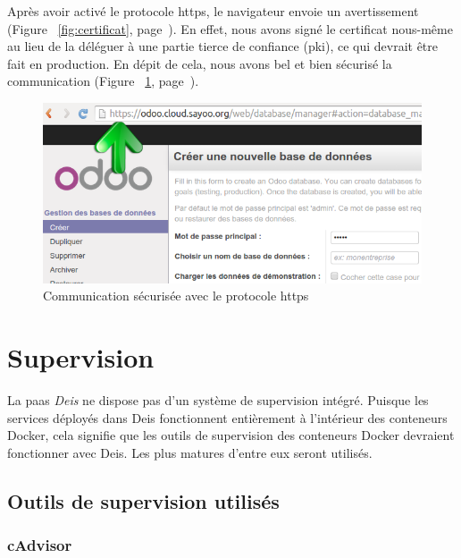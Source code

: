 \begin{onehalfspace}
Après avoir activé le protocole \acrshort{https}, le navigateur envoie un avertissement (Figure ~\ref{fig:certificat}, page~\pageref{fig:certificat}). En effet, nous avons signé le certificat nous-même au lieu de la déléguer à une partie tierce de confiance (\acrshort{pki}), ce qui devrait être fait en production. En dépit de cela, nous avons bel et bien sécurisé la communication (Figure ~\ref{fig:https}, page~\pageref{fig:https}).

\begin{figure}[H]
\centering
\includegraphics [scale=0.5]{chapitre5/assets/https}
\caption{Communication sécurisée avec le protocole \acrshort{https}}
\label{fig:https}
\end{figure}


\section{Supervision}

La \acrshort{paas} \emph{Deis} ne dispose pas d'un système de supervision intégré. Puisque les services déployés dans Deis fonctionnent entièrement à l'intérieur des conteneurs Docker, cela signifie que les outils de supervision des conteneurs Docker devraient fonctionner avec Deis. Les plus matures d'entre eux seront utilisés.


\subsection{Outils de supervision utilisés}

	
\subsubsection*{cAdvisor}



\end{onehalfspace}
